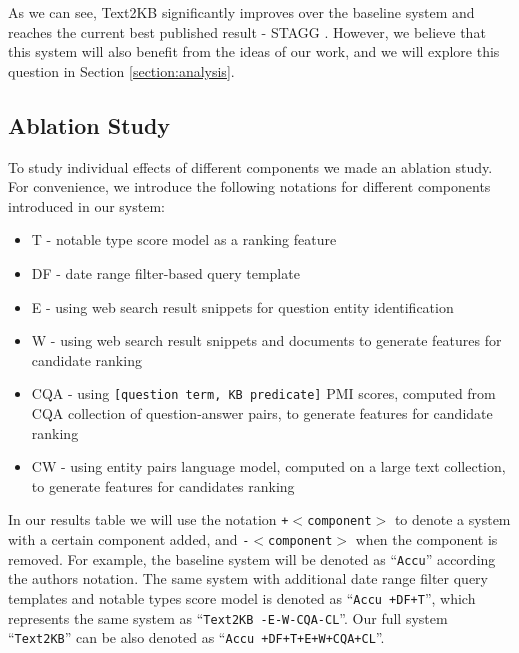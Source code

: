 As we can see, Text2KB significantly improves over the baseline system and reaches the current best published result - STAGG \cite{yih2015semantic}.
However, we believe that this system will also benefit from the ideas of our work, and we will explore this question in Section \ref{section:analysis}.

\subsection{Ablation Study}

To study individual effects of different components we made an ablation study.
For convenience, we introduce the following notations for different components introduced in our system:
\vspace{-0.1cm}
\begin{itemize}
\setlength\itemsep{-0.5em}
\item T - notable type score model as a ranking feature
\item DF - date range filter-based query template
\item E - using web search result snippets for question entity identification
\item W - using web search result snippets and documents to generate features for candidate ranking
\item CQA - using \texttt{[question term, KB predicate]} PMI scores, computed from CQA collection of question-answer pairs, to generate features for candidate ranking
\item CW - using entity pairs language model, computed on a large text collection, to generate features for candidates ranking
\end{itemize}

In our results table we will use the notation \texttt{+$<$component$>$} to denote a system with a certain component added, and \texttt{-$<$component$>$} when the component is removed.
For example, the baseline system will be denoted as ``\texttt{Accu}'' according the authors notation.
The same system with additional date range filter query templates and notable types score model is denoted as ``\texttt{Accu +DF+T}'', which represents the same system as ``\texttt{Text2KB -E-W-CQA-CL}''.
Our full system ``\texttt{Text2KB}'' can be also denoted as ``\texttt{Accu +DF+T+E+W+CQA+CL}''.


